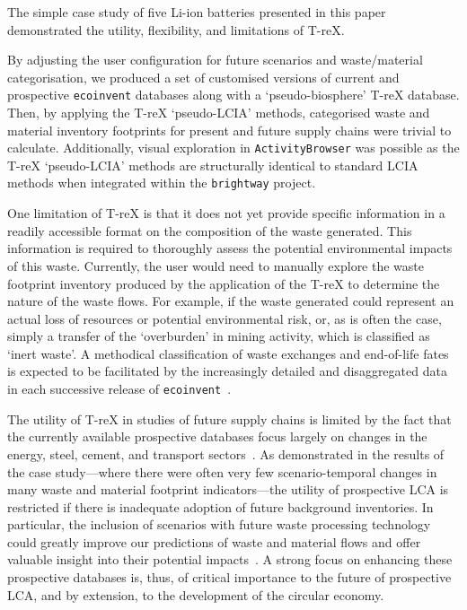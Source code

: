 \documentclass[a4paper,fleqn]{cas-dc}
\begin{document}
The simple case study of five Li-ion batteries presented in this paper
demonstrated the utility, flexibility, and limitations of T-reX.

By adjusting the user configuration for future scenarios and waste/material
categorisation, we produced a set of customised versions of current and
prospective \texttt{ecoinvent} databases along with a `pseudo-biosphere' T-reX
database. Then, by applying the T-reX `pseudo-LCIA' methods, categorised waste
and material inventory footprints for present and future supply chains were
trivial to calculate. Additionally, visual exploration in
\texttt{ActivityBrowser} was possible as the T-reX `pseudo-LCIA' methods are
structurally identical to standard LCIA methods when integrated within the
\texttt{brightway} project.

One limitation of T-reX is that it does not yet provide specific information in
a readily accessible format on the composition of the waste generated. This
information is required to thoroughly assess the potential environmental
impacts of this waste. Currently, the user would need to manually explore the
waste footprint inventory produced by the application of the T-reX to determine
the nature of the waste flows. For example, if the waste generated  could
represent an actual loss of resources or potential environmental risk, or,  as
is often the case, simply a transfer of the `overburden' in mining activity,
which is classified as `inert waste'. A methodical classification of waste
exchanges and end-of-life fates is expected to be facilitated by the
increasingly detailed and disaggregated data in each successive release of
\texttt{ecoinvent}~\citep{fitzgerald2023ecoinventdocumentation}.

The utility of T-reX in studies of future supply chains is limited by the fact
that the currently available prospective databases focus largely on changes in
the energy, steel, cement, and transport sectors~\citep{sacchi2023premisedocs}.
As demonstrated in the results of the case study---where there were often very
few scenario-temporal changes in many waste and material footprint
indicators---the utility of prospective LCA is restricted if there is
inadequate adoption of future background inventories. In particular, the
inclusion of scenarios with future waste processing technology could greatly
improve our predictions of waste and material flows and offer valuable insight
into their potential impacts~\citep{bisinella2024wastelca}. A strong focus on
enhancing these prospective databases is, thus, of critical importance to the
future of prospective LCA, and by extension, to the development of the  circular
economy.
\end{document}
